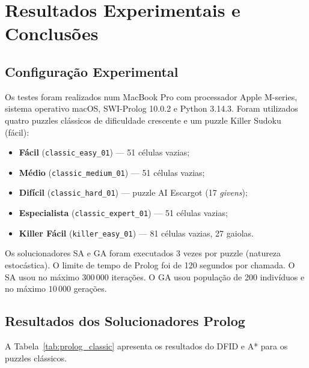 %
%
\chapter{Resultados Experimentais e Conclusões}
\label{cha:resultados}

\section{Configuração Experimental}
\label{sec:config_exp}

Os testes foram realizados num MacBook Pro com processador Apple M-series, sistema operativo macOS, SWI-Prolog 10.0.2 e Python 3.14.3. Foram utilizados quatro puzzles clássicos de dificuldade crescente e um puzzle Killer Sudoku (fácil):

\begin{itemize}
    \item \textbf{Fácil} (\texttt{classic\_easy\_01}) — 51 células vazias;
    \item \textbf{Médio} (\texttt{classic\_medium\_01}) — 51 células vazias;
    \item \textbf{Difícil} (\texttt{classic\_hard\_01}) — puzzle AI Escargot (17 \emph{givens});
    \item \textbf{Especialista} (\texttt{classic\_expert\_01}) — 51 células vazias;
    \item \textbf{Killer Fácil} (\texttt{killer\_easy\_01}) — 81 células vazias, 27 gaiolas.
\end{itemize}

Os solucionadores SA e GA foram executados 3 vezes por puzzle (natureza estocástica). O limite de tempo de Prolog foi de 120 segundos por chamada. O SA usou no máximo $300\,000$ iterações. O GA usou população de 200 indivíduos e no máximo $10\,000$ gerações.

\section{Resultados dos Solucionadores Prolog}
\label{sec:resultados_prolog}

A Tabela~\ref{tab:prolog_classic} apresenta os resultados do DFID e A* para os puzzles clássicos.

